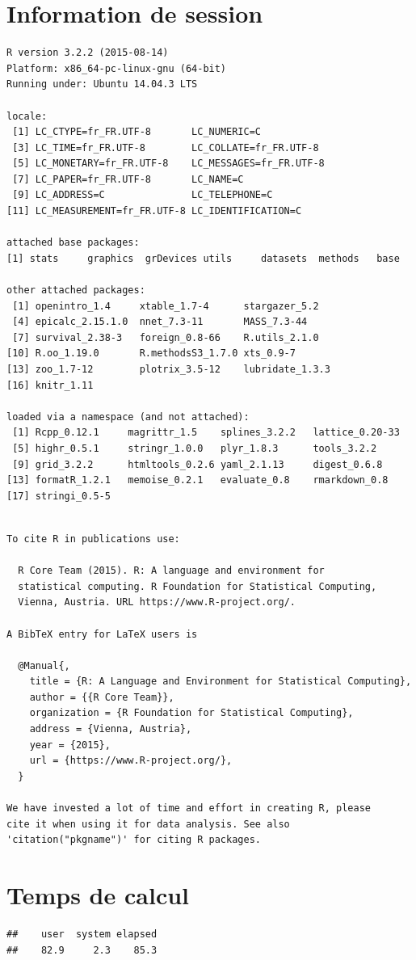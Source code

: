 \documentclass[]{article}
\begin{document}
\section{Information de session}\label{information-de-session}

\begin{verbatim}
R version 3.2.2 (2015-08-14)
Platform: x86_64-pc-linux-gnu (64-bit)
Running under: Ubuntu 14.04.3 LTS

locale:
 [1] LC_CTYPE=fr_FR.UTF-8       LC_NUMERIC=C              
 [3] LC_TIME=fr_FR.UTF-8        LC_COLLATE=fr_FR.UTF-8    
 [5] LC_MONETARY=fr_FR.UTF-8    LC_MESSAGES=fr_FR.UTF-8   
 [7] LC_PAPER=fr_FR.UTF-8       LC_NAME=C                 
 [9] LC_ADDRESS=C               LC_TELEPHONE=C            
[11] LC_MEASUREMENT=fr_FR.UTF-8 LC_IDENTIFICATION=C       

attached base packages:
[1] stats     graphics  grDevices utils     datasets  methods   base     

other attached packages:
 [1] openintro_1.4     xtable_1.7-4      stargazer_5.2    
 [4] epicalc_2.15.1.0  nnet_7.3-11       MASS_7.3-44      
 [7] survival_2.38-3   foreign_0.8-66    R.utils_2.1.0    
[10] R.oo_1.19.0       R.methodsS3_1.7.0 xts_0.9-7        
[13] zoo_1.7-12        plotrix_3.5-12    lubridate_1.3.3  
[16] knitr_1.11       

loaded via a namespace (and not attached):
 [1] Rcpp_0.12.1     magrittr_1.5    splines_3.2.2   lattice_0.20-33
 [5] highr_0.5.1     stringr_1.0.0   plyr_1.8.3      tools_3.2.2    
 [9] grid_3.2.2      htmltools_0.2.6 yaml_2.1.13     digest_0.6.8   
[13] formatR_1.2.1   memoise_0.2.1   evaluate_0.8    rmarkdown_0.8  
[17] stringi_0.5-5  
\end{verbatim}

\begin{verbatim}

To cite R in publications use:

  R Core Team (2015). R: A language and environment for
  statistical computing. R Foundation for Statistical Computing,
  Vienna, Austria. URL https://www.R-project.org/.

A BibTeX entry for LaTeX users is

  @Manual{,
    title = {R: A Language and Environment for Statistical Computing},
    author = {{R Core Team}},
    organization = {R Foundation for Statistical Computing},
    address = {Vienna, Austria},
    year = {2015},
    url = {https://www.R-project.org/},
  }

We have invested a lot of time and effort in creating R, please
cite it when using it for data analysis. See also
'citation("pkgname")' for citing R packages.
\end{verbatim}

\section{Temps de calcul}\label{temps-de-calcul}

\begin{verbatim}
##    user  system elapsed 
##    82.9     2.3    85.3
\end{verbatim}
\end{document}
